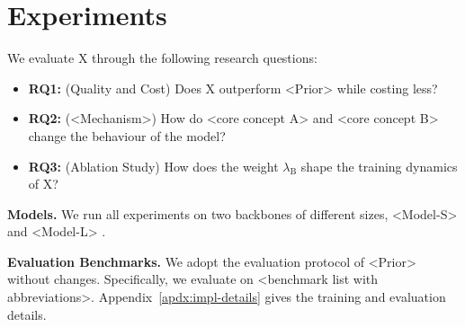 \section{Experiments}
We evaluate X through the following research questions:
\begin{itemize}[leftmargin=*]
    \item \textbf{RQ1:} (Quality and Cost) Does X outperform <Prior> while costing less?
    \item \textbf{RQ2:} (<Mechanism>) How do <core concept A> and <core concept B> change the behaviour of the model?
    \item \textbf{RQ3:} (Ablation Study) How does the weight $\lambda_{\text{B}}$ shape the training dynamics of X?
\end{itemize}

\textbf{Models.} We run all experiments on two backbones of different sizes, <Model-S> and <Model-L> \cite{Placeholder-A}.

\textbf{Evaluation Benchmarks.} We adopt the evaluation protocol of <Prior> \cite{Placeholder-B} without changes.
Specifically, we evaluate on <benchmark list with abbreviations>.
Appendix~\ref{apdx:impl-details} gives the training and evaluation details.

